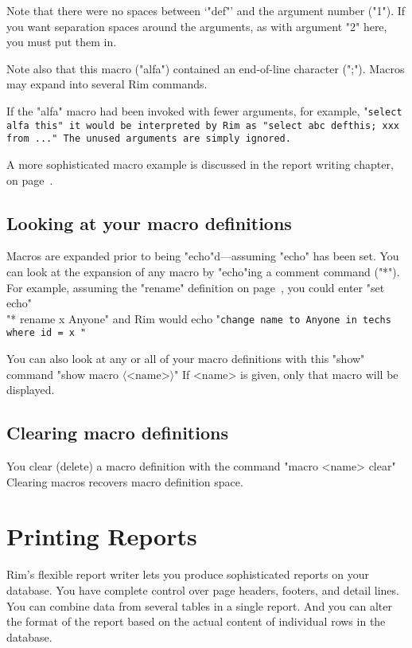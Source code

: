 \documentclass[11pt,a4paper]{report}
\def\opt#1{$\langle \mbox{#1} \rangle$}
\def\I{\index}
\begin{document}
Note that there were no spaces between `"def"' and the argument number ("1").
If you want separation spaces around the arguments, as with argument
"2" here, you must put them in.
 
Note also that this macro ("alfa") contained an end-of-line character
(";").  Macros may expand into several Rim commands.
 
If the "alfa" macro had been invoked with fewer arguments, for example,
"\tt select alfa this"
it would be interpreted by Rim as
"\tt select abc  defthis; xxx from ..."
The unused arguments are simply ignored.
 
A more sophisticated macro example is discussed
in the report writing chapter, on page~\pageref{run-mac}.
 
\section{Looking at your macro definitions}
\label{show-mac}
Macros are expanded prior to being "echo"d---assuming "echo"
has been set.
You can look at the expansion of any macro by "echo"ing a
comment command ("*").  For example, assuming the "rename" 
definition on page~\pageref{rename-def}, you could enter
"set echo"\\"* rename x Anyone"
and Rim would echo
"\tt change name to Anyone in techs where id = x "
   

You can also look at any or all of your macro definitions
with this "show" command
"show macro \opt{<name>}"
If <name> is given, only that macro will be displayed.
 
\section{Clearing macro definitions}
You clear (delete) a macro definition with the command
"macro <name> clear"
Clearing macros recovers macro definition space.
\I{macros|)}
 
 
%
%
\def\demobreak{\par\pagebreak[3]\bigskip}
\def\Rimdisp{\setbox\Rimdemobox=\vbox\bgroup\hsize=29pc\scriptsize}
\def\enddisp{\egroup\noindent
  \makebox[\textwidth]{\fbox{\fbox{\box\Rimdemobox}}}}
%
\chapter{Printing Reports}
%
\label{report-writer}
\I{Reports|(}
Rim's flexible report writer lets you produce
sophisticated reports on your database.
You have complete control over page headers, footers,
and detail lines.  You can combine data from several tables
in a single report. And you can alter the format of the
report based on the actual content of individual rows
in the database.
 
\end{document}
